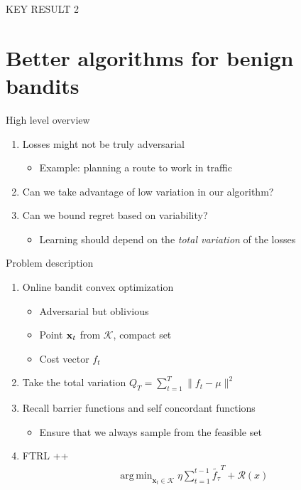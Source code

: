 \documentclass{beamer}
\DeclareMathOperator*{\argmin}{arg\,min}
\begin{document}
\begin{frame}{KEY RESULT 2}

\end{frame}
\section{Better algorithms for benign bandits}
\begin{frame}{High level overview}

  \begin{enumerate}
  \item
    Losses might not be truly adversarial
    \begin{itemize}   
    \item
      Example: planning a route to work in traffic
    \end{itemize}
    \item
      Can we take advantage of low variation in our algorithm?
    \item
       Can we bound regret based on variability?
      \begin{itemize}
        \item
          Learning should depend on the \textit{total variation} of the losses
        \end{itemize}
  \end{enumerate}
\end{frame}

\begin{frame}{Problem description}
  \begin{enumerate}
    \item
    Online bandit convex optimization
    \begin{itemize}
      \item
        Adversarial but oblivious
      \item
        Point ${\bf x}_t$ from $\mathcal{K}$, compact set
      \item
        Cost vector $f_{t}$
      \end{itemize}
    \item
      Take the total variation
      $Q_T=\sum_{t=1}^T \| f_t - \mu \|^2$
    \item
      Recall barrier functions and self concordant functions
      \begin{itemize}
        \item
          Ensure that we always sample from the feasible set
        \end{itemize}
     \item
       FTRL ++
        \begin{align*}
          \argmin_{{\textbf{x}}_t\in\mathcal{K}}\eta \sum_{t=1}^{t-1} \tilde{f_{\tau}}^T + \mathcal{R}(x)
        \end{align*}

    \end{enumerate}
  \end{frame}
       
\end{document}
